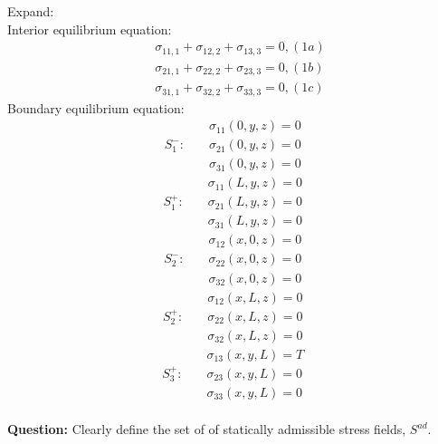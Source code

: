 \documentclass[letter,12pt]{article}
\begin{document}
 Expand: \\
 Interior equilibrium equation:
 \begin{equation}
 \begin{aligned}
 & \sigma_{11,1}+\sigma_{12,2}+\sigma_{13,3}=0, (1a) \\
 & \sigma_{21,1}+\sigma_{22,2}+\sigma_{23,3}=0, (1b) \\
 & \sigma_{31,1}+\sigma_{32,2}+\sigma_{33,3}=0, (1c)
 \end{aligned}
 \end{equation}
 Boundary equilibrium equation: 
 \begin{equation}
 S_{1}^{-}: \text{	}
 \begin{aligned}
 &\sigma_{11}(0,y,z)=0\\
 &\sigma_{21}(0,y,z)=0\\
 &\sigma_{31}(0,y,z)=0
 \end{aligned}
 \end{equation}
 \begin{equation}
 S_{1}^{+}: \text{	}
 \begin{aligned}
 &\sigma_{11}(L,y,z)=0\\
 &\sigma_{21}(L,y,z)=0\\
 &\sigma_{31}(L,y,z)=0
 \end{aligned}
 \end{equation}
 \begin{equation}
 S_{2}^{-}: \text{	}
 \begin{aligned}
 &\sigma_{12}(x,0,z)=0\\
 &\sigma_{22}(x,0,z)=0\\
 &\sigma_{32}(x,0,z)=0
 \end{aligned}
 \end{equation}
 \begin{equation}
 S_{2}^{+}: \text{	}
 \begin{aligned}
 &\sigma_{12}(x,L,z)=0\\
 &\sigma_{22}(x,L,z)=0\\
 &\sigma_{32}(x,L,z)=0
 \end{aligned}
 \end{equation}
 \begin{equation}
 S_{3}^{+}: \text{	}
 \begin{aligned}
 &\sigma_{13}(x,y,L)=T\\
 &\sigma_{23}(x,y,L)=0\\
 &\sigma_{33}(x,y,L)=0
 \end{aligned}
 \end{equation}
 \\ 
 \noindent \textbf{Question:} Clearly define the set of of statically admissible stress fields, $S^{ad}$. \\
 
\end{document}
